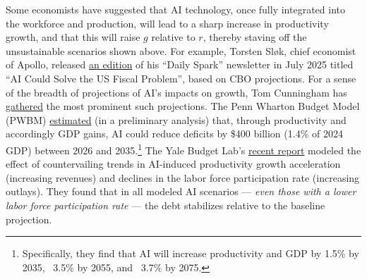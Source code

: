 \documentclass[12pt]{article}
\begin{document}
Some economists have suggested that AI technology, once fully integrated into the workforce and production, will lead to a sharp increase in productivity growth, and that this will raise $g$ relative to $r$, thereby staving off the unsustainable scenarios shown above. For example, Torsten Sløk, chief economist of Apollo, released \href{https://www.apolloacademy.com/ai-could-solve-the-us-fiscal-problem/}{an edition} of his ``Daily Spark'' newsletter in July 2025 titled ``AI Could Solve the US Fiscal Problem'', based on CBO projections. For a sense of the breadth of projections of AI's impacts on growth, Tom Cunningham has \href{https://tecunningham.github.io/posts/2025-10-19-forecasts-of-AI-growth.html}{gathered} the most prominent such projections. The Penn Wharton Budget Model (PWBM) \href{https://budgetmodel.wharton.upenn.edu/issues/2025/9/8/projected-impact-of-generative-ai-on-future-productivity-growth}{estimated} (in a preliminary analysis) that, through productivity and accordingly GDP gains, AI could reduce deficits by \$400 billion (1.4\% of 2024 GDP) between 2026 and 2035.\footnote{Specifically, they find that AI will increase productivity and GDP by 1.5\% by 2035, ~3.5\% by 2055, and ~3.7\% by 2075.} The Yale Budget Lab's \href{https://budgetlab.yale.edu/research/what-might-ai-adoption-mean-fiscal-and-economic-outlook}{recent report} modeled the effect of countervailing trends in AI-induced productivity growth acceleration (increasing revenues) and declines in the labor force participation rate (increasing outlays). They found that in all modeled AI scenarios --- \textit{even those with a lower labor force participation rate} --- the debt stabilizes relative to the baseline projection.
\end{document}
